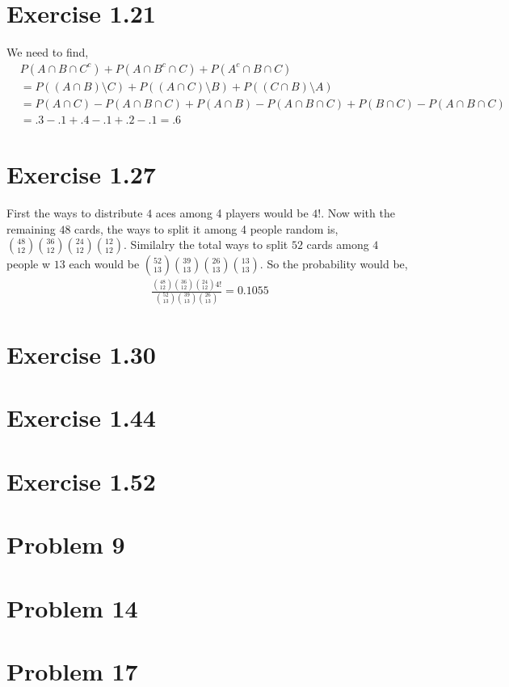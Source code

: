 \documentclass[a4paper]{report}
\begin{document}
\section*{Exercise 1.21}
We need to find, 
\begin{align*}
    &P(A \cap B \cap C^{c})  +  P(A \cap B^{c} \cap C) +  P(A^{c} \cap B \cap C) \\&=P((A \cap B)\setminus  C)  + P((A \cap C)\setminus  B)  + P((C \cap B)\setminus  A) \\
    &= P(A \cap C) - P(A \cap B \cap  C)  + P(A \cap B) - P(A \cap B \cap  C)  + P(B \cap C) - P(A \cap B \cap  C) \\
    &= .3 - .1 + .4 - .1 + .2 - .1 = .6
\end{align*}
\section*{Exercise 1.27}
First the ways to distribute $4$ aces among 4 players would be $4!$. Now with the remaining  $48$ cards, the ways to split it among 4 people random is, ${48 \choose 12}{36 \choose 12}{24 \choose 12}{12 \choose 12}$. Similalry the total ways to split $52$ cards among  $4$ people w $13$ each would be ${52 \choose 13}{39 \choose 13}{26 \choose 13}{13 \choose 13}$. So the probability would be, 
\begin{align*}
\frac{{48 \choose 12}{36 \choose 12}{24 \choose 12}4!}{{52 \choose 13}{39 \choose 13}{26 \choose 13}} = 0.1055
\end{align*}


\section*{Exercise 1.30}
\section*{Exercise 1.44}
\section*{Exercise 1.52}

\section*{Problem 9}
\section*{Problem 14}
\section*{Problem 17}
\end{document}
